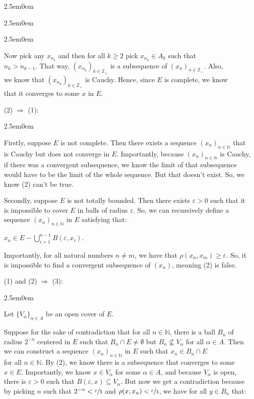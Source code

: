 \documentclass{book}
\newenvironment{myIndent}{%
   \begin{adjustwidth}{2.5em}{0em}%
}{%
   \end{adjustwidth}%
}
\newcommand{\retTwo}{\hfill\bigbreak}
\begin{document}
\begin{myIndent}
\begin{myIndent}
\begin{myIndent}
         Now pick any $x_{n_1}$ and then for all $k \geq 2$ pick $x_{n_k} \in A_k$ such that\\ $n_k > n_{k - 1}$. That way, $(x_{n_k})_{k \in \mathbb{Z}_+}$ is a subsequence of $(x_{n})_{n \in \mathbb{Z}_+}$. Also,\\ we know that $(x_{n_k})_{k \in \mathbb{Z}_+}$ is Cauchy. Hence, since $E$ is complete, we know\\ that it converges to some $x$ in $E$.\retTwo
      \end{myIndent}

      (2) $\Longrightarrow$ (1):
      \begin{myIndent}
         Firstly, suppose $E$ is not complete. Then there exists a sequence $(x_n)_{n \in \mathbb{N}}$ that is Cauchy but does not converge in $E$. Importantly, because $(x_n)_{n \in \mathbb{N}}$ is Cauchy, if there was a convergent subsequence, we know the limit of that subsequence would have to be the limit of the whole sequence. But that doesn't exist. So, we know (2) can't be true.\retTwo

         Secondly, suppose $E$ is not totally bounded. Then there exists $\varepsilon > 0$ such that it is impossible to cover $E$ in balls of radius $\varepsilon$. So, we can recursively define a sequence $(x_n)_{n \in \mathbb{N}}$ in $E$ satisfying that:
         
         {\centering$x_n \in E - \bigcup\limits_{i = 1}^{n-1}B(\varepsilon, x_{i})$.\retTwo\par}

         Importantly, for all natural numbers $n \neq m$, we have that $\rho(x_n, x_m) \geq \varepsilon$. So, it is impossible to find a convergent subsequence of $(x_n)$, meaning (2) is false.\retTwo
      \end{myIndent}

      (1) and (2) $\Longrightarrow$ (3):
      \begin{myIndent}
         Let $\{V_\alpha\}_{\alpha \in A}$ be an open cover of $E$.\retTwo

         Suppose for the sake of contradiction that for all $n \in \mathbb{N}$, there is a ball $B_n$ of radius $2^{-n}$ centered in $E$ such that $B_n \cap E \neq \emptyset$ but $B_n \not\subseteq V_\alpha$ for all $\alpha \in A$. Then we can construct a sequence $(x_n)_{n \in \mathbb{N}}$ in $E$ such that $x_n \in B_n \cap E$\\ for all $n \in \mathbb{N}$. By (2), we know there is a subsequence that converges to some $x \in E$. Importantly, we know $x \in V_\alpha$ for some $\alpha \in A$, and because $V_\alpha$ is open, there is $\varepsilon > 0$ such that $B(\varepsilon, x) \subseteq V_\alpha$. But now we get a contradiction because by picking $n$ such that $2^{-n} < \sfrac{\varepsilon}{3}$ and $\rho(x, x_n) < \sfrac{\varepsilon}{3}$, we have for all $y \in B_n$ that:


\end{myIndent}
\end{myIndent}
\end{myIndent}
\end{document}

